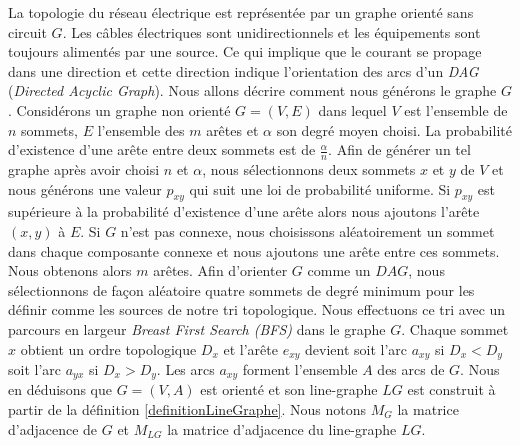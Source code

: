 La topologie du r\'eseau \'electrique est repr\'esent\'ee par un graphe orient\'e sans circuit $G$.
Les c\^ables \'electriques sont unidirectionnels et les \'equipements sont toujours aliment\'es par une source. Ce qui implique que le courant se propage dans une direction et cette direction  indique l'orientation des arcs d'un {\em DAG} ({\em Directed Acyclic Graph}).
Nous allons d\'ecrire comment nous g\'en\'erons le graphe $G$.
\newline
Consid\'erons un graphe non orient\'e $G=(V, E)$ dans lequel  $V$ est l'ensemble de $n$ sommets, $E$ l'ensemble des $m$ ar\^etes et $\alpha$ son degr\'e moyen choisi. 
La probabilit\'e d'existence d'une ar\^ete entre deux sommets est de $\frac{\alpha}{n}$. 
Afin de g\'en\'erer un tel graphe apr\`es avoir choisi $n$ et $\alpha$, nous s\'electionnons  deux sommets $x$ et $y$ de $V$ et nous g\'en\'erons une valeur $p_{xy}$ qui suit  une loi de probabilit\'e uniforme.
Si $p_{xy}$ est sup\'erieure \`a la probabilit\'e d'existence d'une ar\^ete alors nous ajoutons l'ar\^ete $(x,y)$ \`a $E$.
\newline
Si $G$ n'est pas connexe, nous choisissons al\'eatoirement un sommet dans chaque composante connexe et nous ajoutons une ar\^ete entre ces sommets.  Nous obtenons alors  $m$ ar\^etes.
\newline
Afin d'orienter $G$ comme un $DAG$, nous s\'electionnons de fa\c con al\'eatoire quatre sommets  de degr\'e minimum pour les d\'efinir comme les sources de notre tri topologique.
Nous effectuons ce tri avec un parcours en largeur {\em Breast First Search (BFS)} dans le graphe $G$. 
Chaque sommet $x$ obtient un ordre topologique $D_x$ et l'ar\^ete $e_{xy}$ devient 
soit l'arc $a_{xy}$ si $D_x < D_y$ 
soit l'arc $a_{yx}$ si $D_x > D_y$. 
Les arcs $a_{xy}$ forment l'ensemble $A$ des arcs de $G$. 
Nous en d\'eduisons que $G=(V, A)$ est orient\'e et son line-graphe $LG$ est construit \`a partir de la d\'efinition \ref{definitionLineGraphe}.
\newline
Nous notons $M_{G}$  la matrice d'adjacence de $G$ et $M_{LG}$ la matrice d'adjacence du line-graphe $LG$.
